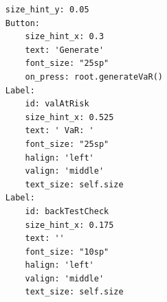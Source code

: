 \documentclass{article}
\begin{document}
\begin{verbatim}
                  size_hint_y: 0.05
                  Button:
                      size_hint_x: 0.3
                      text: 'Generate'
                      font_size: "25sp"
                      on_press: root.generateVaR()        
                  Label:
                      id: valAtRisk
                      size_hint_x: 0.525
                      text: ' VaR: '
                      font_size: "25sp"
                      halign: 'left'
                      valign: 'middle'
                      text_size: self.size
                  Label:
                      id: backTestCheck
                      size_hint_x: 0.175
                      text: ''
                      font_size: "10sp"
                      halign: 'left'
                      valign: 'middle'
                      text_size: self.size

\end{verbatim}
\end{document}
